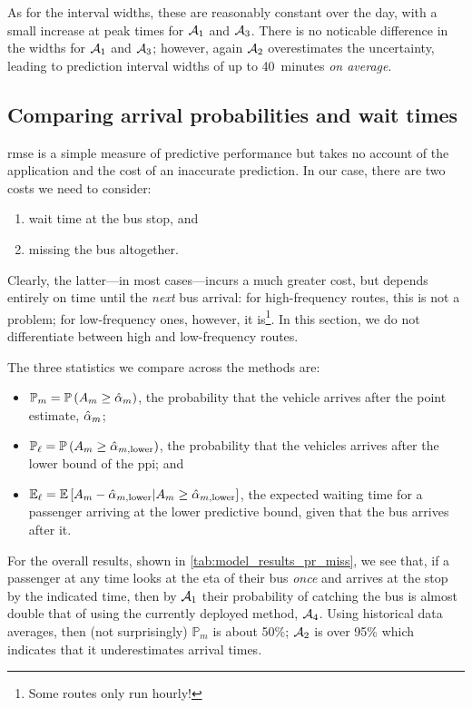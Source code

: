 As for the interval widths, these are reasonably constant over the day, with a small increase at peak times for $\mathcal{A}_1$ and $\mathcal{A}_3$. There is no noticable difference in the widths for $\mathcal{A}_1$ and $\mathcal{A}_3$; however, again $\mathcal{A}_2$ overestimates the uncertainty, leading to prediction interval widths of up to 40~minutes \emph{on average}.



\subsection{Comparing arrival probabilities and wait times}
\label{sec:prediction_model_comp_probs}

\Gls{rmse} is a simple measure of predictive performance but takes no account of the application and the cost of an inaccurate prediction. In our case, there are two costs we need to consider:
\begin{enumerate}
\item wait time at the bus stop, and
\item missing the bus altogether.
\end{enumerate}
Clearly, the latter---in most cases---incurs a much greater cost, but depends entirely on time until the \emph{next} bus arrival: for high-frequency routes, this is not a problem; for low-frequency ones, however, it is\footnote{Some routes only run hourly!}. In this section, we do not differentiate between high and low-frequency routes.


The three statistics we compare across the methods are:
\begin{itemize}
\item $\mathbb{P}_m = \mathbb{P}\left(A_m \geq \hat{\alpha}_m\right)$, the probability that the vehicle arrives after the point estimate, $\hat{\alpha}_m$;
\item $\mathbb{P}_\ell = \mathbb{P}\left(A_m \geq \hat\alpha_{m,\text{lower}}\right)$, the probability that the vehicles arrives after the lower bound of the \gls{ppi}; and
\item $\mathbb{E}_\ell = \mathbb{E}\left[A_m - \hat\alpha_{m,\text{lower}} | A_m \geq \hat\alpha_{m,\text{lower}}\right]$, the expected waiting time for a passenger arriving at the lower predictive bound, given that the bus arrives after it.
\end{itemize}


For the overall results, shown in \cref{tab:model_results_pr_miss}, we see that, if a passenger at any time looks at the \gls{eta} of their bus \emph{once} and arrives at the stop by the indicated time, then by $\mathcal{A}_1$ their probability of catching the bus is almost double that of using the currently deployed method, $\mathcal{A}_4$. Using historical data averages, then (not surprisingly) $\mathbb{P}_m$ is about 50\%; $\mathcal{A}_2$ is over 95\% which indicates that it underestimates arrival times.


